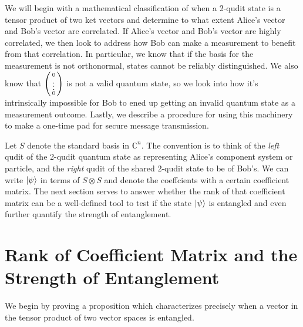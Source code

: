 We will begin with a mathematical classification of when a 2-qudit state is a tensor product of two ket vectors and determine to what extent Alice's vector and Bob's vector are correlated. If Alice's vector and Bob's vector are highly correlated, we then look to address how Bob can make a measurement to benefit from that correlation. In particular, we know that if the basis for the measurement is not orthonormal, states cannot be reliably distinguished. We also know that $\left(\begin{smallmatrix}0\\ \vdots \\0\end{smallmatrix}\right)$ is not a valid quantum state, so we look into how it's intrinsically impossible for Bob to ened up getting an invalid quantum state as a measurement outcome.
Lastly, we describe a procedure for using this machinery to make a one-time pad for secure message transmission.

Let $S$ denote the standard basis in $\mathbb{C}^n$. The convention is to think of the \textit{left} qudit of the 2-qudit quantum state as representing Alice's component system or particle, and the \textit{right} qudit of the shared 2-qudit state to be of Bob's. We can write $\ket{\psi}$ in terms of $S \otimes S$ and denote the coeffcients with a certain coefficient matrix. The next section serves to answer whether the rank of that coefficient matrix can be a well-defined tool to test if the state $\ket{\psi}$ is entangled and even further quantify the strength of entanglement.


\section{Rank of Coefficient Matrix and the Strength of Entanglement}

We begin by proving a proposition which characterizes precisely when a vector in the tensor product of two vector spaces is entangled.

